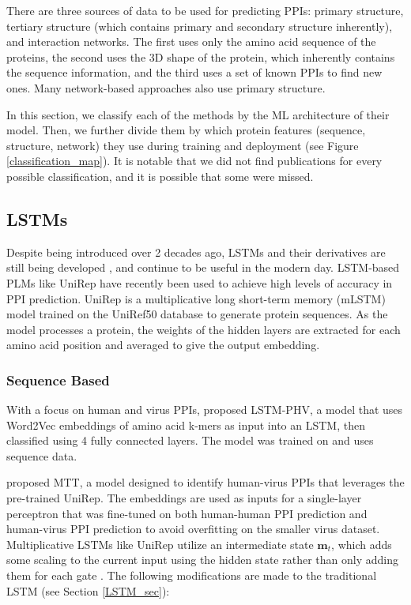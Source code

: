 \documentclass{article}
\begin{document}
There are three sources of data to be used for predicting PPIs: primary structure, tertiary structure (which contains primary and secondary structure inherently), and interaction networks. The first uses only the amino acid sequence of the proteins, the second uses the 3D shape of the protein, which inherently contains the sequence information, and the third uses a set of known PPIs to find new ones. Many network-based approaches also use primary structure. 

In this section, we classify each of the methods by the ML architecture of their model. Then, we further divide them by which protein features (sequence, structure, network) they use during training and deployment (see Figure \ref{classification_map}). It is notable that we did not find publications for every possible classification, and it is possible that some were missed.
\subsection{LSTMs}
Despite being introduced over 2 decades ago, LSTMs \citep{lstm} and their derivatives are still being developed \citep{beck_xlstm_2024}, and continue to be useful in the modern day. LSTM-based PLMs like UniRep \citep{alley_unified_2019} have recently been used to achieve high levels of accuracy in PPI prediction. UniRep \citep{alley_unified_2019} is a multiplicative long short-term memory (mLSTM) model trained on the UniRef50 \citep{suzek_uniref_2014} database to generate protein sequences. As the model processes a protein, the weights of the hidden layers are extracted for each amino acid position and averaged to give the output embedding.

\subsubsection{Sequence Based}
With a focus on human and virus PPIs, \citet{tsukiyama_lstm-phv_2021} proposed LSTM-PHV, a model that uses Word2Vec embeddings of amino acid k-mers as input into an LSTM, then classified using 4 fully connected layers. The model was trained on and uses sequence data.

\citet{dong_multitask_2021} proposed MTT, a model designed to identify human-virus PPIs that leverages the pre-trained UniRep. The embeddings are used as inputs for a single-layer perceptron that was fine-tuned on both human-human PPI prediction and human-virus PPI prediction to avoid overfitting on the smaller virus dataset. Multiplicative LSTMs like UniRep utilize an intermediate state \(\mathbf{m}_t\), which adds some scaling to the current input using the hidden state rather than only adding them for each gate \citep{krause2017multiplicativelstmsequencemodelling}. The following modifications are made to the traditional LSTM (see Section \ref{LSTM_sec}):
\end{document}
